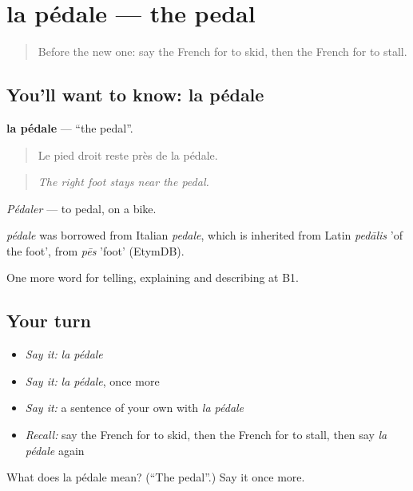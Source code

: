 \section[la pédale]{la pédale — the pedal}

\label{lesson:FR-C401-pedale}



\begin{quote}
Before the new one: say the French for to skid, then the French for to stall.
\end{quote}

\subsection*{You'll want to know: la pédale}
\textbf{la pédale} — \textquotedblleft{}the pedal\textquotedblright{}.

\begin{quote}
Le pied droit reste près de la pédale.
\end{quote}

\begin{quote}
\emph{The right foot stays near the pedal.}
\end{quote}

\emph{Pédaler} — to pedal, on a bike.

\begin{cousinweb}
\emph{pédale} was borrowed from Italian \emph{pedale}, which is inherited from Latin \emph{pedālis} 'of the foot', from \emph{pēs} 'foot' (EtymDB).
\end{cousinweb}

\begin{grammarlens}[title={What you've built}]
One more word for telling, explaining and describing at B1.
\end{grammarlens}

\subsection*{Your turn}
\begin{itemize}
\raggedright
  \item \emph{Say it:} \emph{la pédale}
  \item \emph{Say it:} \emph{la pédale}, once more
  \item \emph{Say it:} a sentence of your own with \emph{la pédale}
  \item \emph{Recall:} say the French for to skid, then the French for to stall, then say \emph{la pédale} again
\end{itemize}

\begin{tcolorbox}[breakable,colback=teal!4,colframe=teal!35!black,title={Before you move on}]
What does la pédale mean? (\textquotedblleft{}The pedal\textquotedblright{}.) Say it once more.
\end{tcolorbox}
